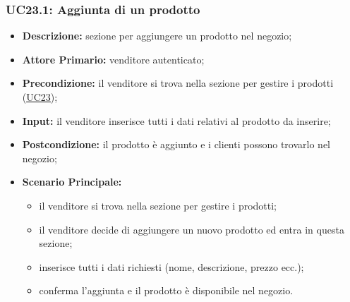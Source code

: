         \subsubsection{UC23.1: Aggiunta di un prodotto}
        \begin{itemize}
            \item \textbf{Descrizione:} sezione per aggiungere un prodotto nel negozio;
            \item \textbf{Attore Primario:} venditore autenticato;
            \item \textbf{Precondizione:} il venditore si trova nella sezione per gestire i prodotti (\hyperref[sec:UC23]{\underline{UC23}});
            \item \textbf{Input:} il venditore inserisce tutti i dati relativi al prodotto da inserire;
            \item \textbf{Postcondizione:} il prodotto è aggiunto e i clienti possono trovarlo nel negozio;
            \item \textbf{Scenario Principale:} 
                \begin{itemize}
                    \item il venditore si trova nella sezione per gestire i prodotti;
                    \item il venditore decide di aggiungere un nuovo prodotto ed entra in questa sezione;
                    \item inserisce tutti i dati richiesti (nome, descrizione, prezzo ecc.);
                    \item conferma l'aggiunta e il prodotto è disponibile nel negozio.
                \end{itemize}
        \end{itemize}
